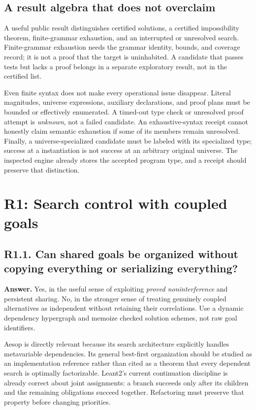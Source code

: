 \documentclass[11pt,a4paper]{article}
\newcommand{\code}[1]{\texttt{\detokenize{#1}}}
\newcommand{\question}[2]{\subsection{#1. #2}\label{q:#1}}
\theoremstyle{definition}
\theoremstyle{remark}
\begin{document}
\subsection{A result algebra that does not overclaim}

A useful public result distinguishes certified solutions, a certified impossibility theorem, finite-grammar exhaustion, and an interrupted or unresolved search. Finite-grammar exhaustion needs the grammar identity, bounds, and coverage record; it is not a proof that the target is uninhabited. A candidate that passes tests but lacks a proof belongs in a separate exploratory result, not in the certified list.

Even finite syntax does not make every operational issue disappear. Literal magnitudes, universe expressions, auxiliary declarations, and proof plans must be bounded or effectively enumerated. A timed-out type check or unresolved proof attempt is \emph{unknown}, not a failed candidate. An exhaustive-syntax receipt cannot honestly claim semantic exhaustion if some of its members remain unresolved. Finally, a universe-specialized candidate must be labeled with its specialized type; success at a \code{Prop} instantiation is not success at an arbitrary original universe. The inspected engine already stores the accepted program type, and a receipt should preserve that distinction.\cite{repo-engine}

\section{R1: Search control with coupled goals}\label{sec:r1}

\question{R1.1}{Can shared goals be organized without copying everything or serializing everything?}

\textbf{Answer.} Yes, in the useful sense of exploiting \emph{proved noninterference} and persistent sharing. No, in the stronger sense of treating genuinely coupled alternatives as independent without retaining their correlations. Use a dynamic dependency hypergraph and memoize checked solution schemes, not raw goal identifiers.

Aesop is directly relevant because its search architecture explicitly handles metavariable dependencies. Its general best-first organization should be studied as an implementation reference rather than cited as a theorem that every dependent search is optimally factorizable.\cite{aesop} Leant2's current continuation discipline is already correct about joint assignments: a branch succeeds only after its children and the remaining obligations succeed together.\cite{repo-search} Refactoring must preserve that property before changing priorities.
\end{document}
